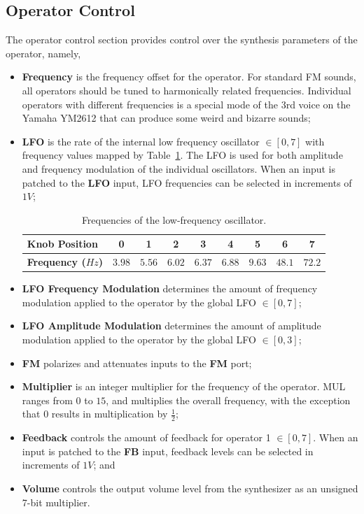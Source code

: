 \documentclass[12pt,letter]{article}
\begin{document}
\subsection{Operator Control}

The operator control section provides control over the synthesis parameters of the operator, namely,

\begin{itemize}
 \item \textbf{Frequency} is the frequency offset for the operator. For standard FM sounds, all operators should be tuned to harmonically related frequencies. Individual operators with different frequencies is a special mode of the 3rd voice on the Yamaha YM2612 that can produce some weird and bizarre sounds;
 \item \textbf{LFO} is the rate of the internal low frequency oscillator $\in [0, 7]$ with frequency values mapped by Table~\ref{tab:lfo-frequencies}. The LFO is used for both amplitude and frequency modulation of the individual oscillators. When an input is patched to the \textbf{LFO} input, LFO frequencies can be selected in increments of $1V$;%
  \begin{table}[!htp]
  \centering
  \caption{Frequencies of the low-frequency oscillator.}
  \label{tab:lfo-frequencies}
  \begin{tabular}{|l|c|c|c|c|c|c|c|c|}
  \hline
  \bfseries Knob Position    & 0      & 1      & 2      & 3      & 4      & 5      & 6      & 7      \\
  \hline
  \bfseries Frequency ($Hz$) & $3.98$ & $5.56$ & $6.02$ & $6.37$ & $6.88$ & $9.63$ & $48.1$ & $72.2$ \\
  \hline
  \end{tabular}
  \end{table}
 \item \textbf{LFO Frequency Modulation} determines the amount of frequency modulation applied to the operator by the global LFO $\in [0, 7]$;
 \item \textbf{LFO Amplitude Modulation} determines the amount of amplitude modulation applied to the operator by the global LFO $\in [0, 3]$;
 \item \textbf{FM} polarizes and attenuates inputs to the \textbf{FM} port;
 \item \textbf{Multiplier} is an integer multiplier for the frequency of the operator. MUL ranges from $0$ to $15$, and multiplies the overall frequency, with the exception that $0$ results in multiplication by $\frac{1}{2}$;
 \item \textbf{Feedback} controls the amount of feedback for operator 1 $\in [0, 7]$. When an input is patched to the \textbf{FB} input, feedback levels can be selected in increments of $1V$; and
 \item \textbf{Volume} controls the output volume level from the synthesizer as an unsigned 7-bit multiplier.
\end{itemize}
\end{document}
